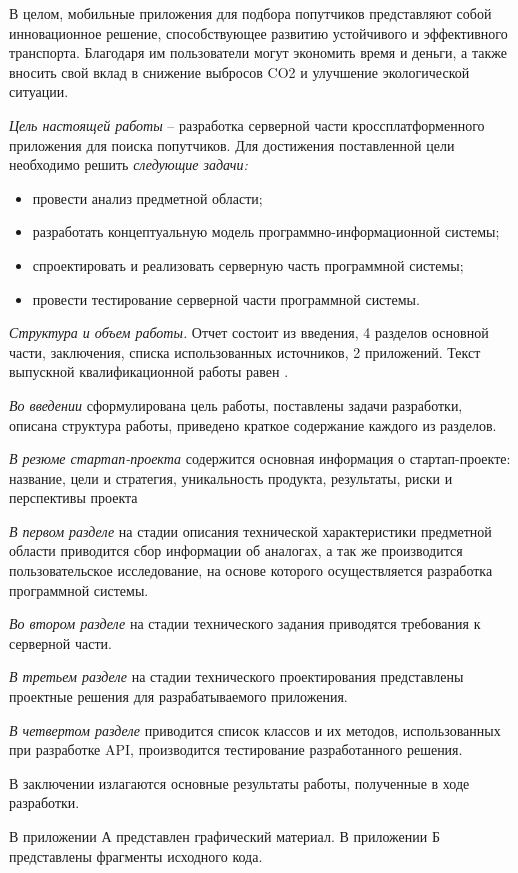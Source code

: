 В целом, мобильные приложения для подбора попутчиков представляют собой инновационное решение, способствующее развитию устойчивого и эффективного транспорта. Благодаря им пользователи могут экономить время и деньги, а также вносить свой вклад в снижение выбросов CO2 и улучшение экологической ситуации.


\emph{Цель настоящей работы} – разработка серверной части кроссплатформенного приложения для поиска попутчиков. Для достижения поставленной цели необходимо решить \emph{следующие задачи:}
\begin{itemize}
\item провести анализ предметной области;
\item разработать концептуальную модель программно-информационной системы;
\item спроектировать и реализовать серверную часть программной системы;
\item провести тестирование серверной части программной системы.
\end{itemize}

\emph{Структура и объем работы.} Отчет состоит из введения, 4 разделов основной части, заключения, списка использованных источников, 2 приложений. Текст выпускной квалификационной работы равен .

\emph{Во введении} сформулирована цель работы, поставлены задачи разработки, описана структура работы, приведено краткое содержание каждого из разделов.

\emph{В резюме стартап-проекта} содержится основная информация о стартап-проекте: название, цели и стратегия, уникальность продукта, результаты, риски и перспективы проекта

\emph{В первом разделе} на стадии описания технической характеристики предметной области приводится сбор информации об аналогах, а так же производится пользовательское исследование, на основе которого осуществляется разработка программной системы.

\emph{Во втором разделе} на стадии технического задания приводятся требования к серверной части.

\emph{В третьем разделе} на стадии технического проектирования представлены проектные решения для разрабатываемого приложения.

\emph{В четвертом разделе} приводится список классов и их методов, использованных при разработке API, производится тестирование разработанного решения.

В заключении излагаются основные результаты работы, полученные в ходе разработки.

В приложении А представлен графический материал.
В приложении Б представлены фрагменты исходного кода. 

